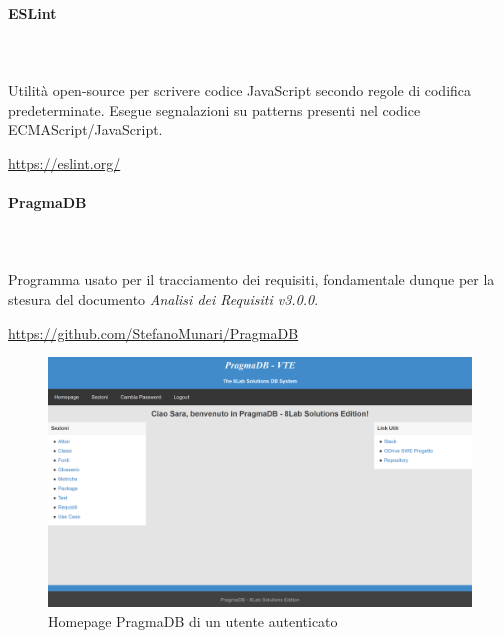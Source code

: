 \begin{itemize}
		\paragraph{ESLint} \mbox{}\\ \mbox{}\\
		Utilità open-source per scrivere codice JavaScript secondo regole di codifica 
		predeterminate. Esegue segnalazioni su patterns presenti nel codice 
		ECMAScript/JavaScript.\\
		\centerline{\url{https://eslint.org/}}
				
		\paragraph{PragmaDB} \mbox{}\\ \mbox{}\\
		Programma usato per il tracciamento dei requisiti, fondamentale dunque 
		per la stesura del documento \textit{Analisi dei Requisiti v3.0.0}. 
		\newline
		\centerline{\url{https://github.com/StefanoMunari/PragmaDB}}
			\begin{figure}[H]
				\includegraphics[width=0.99\linewidth]{res/images/HomepagePragmaDB.png}
				\caption{Homepage PragmaDB di un utente autenticato}
			\end{figure}


\end{itemize}
